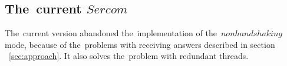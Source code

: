 %
%
%

\subsection*{The~current $Sercom$}\label{sec:current}
  The~current version abandoned the~implementation of the~$nonhandshaking$ mode, 
  because of the~problems with receiving answers described 
  in section ~\ref{sec:approach}.
  It also solves the~problem with	redundant threads. 

